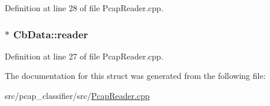 Definition at line 28 of file Pcap\-Reader.\-cpp.

\hypertarget{struct_cb_data_a5215d002d95223186527902c79ef42c3}{
\subsubsection[{reader}]{ $\ast$ Cb\-Data\-::reader}}\label{struct_cb_data_a5215d002d95223186527902c79ef42c3}


Definition at line 27 of file Pcap\-Reader.\-cpp.



The documentation for this struct was generated from the following file\-:\begin{DoxyCompactItemize}
\item 
src/pcap\-\_\-classifier/src/\hyperlink{pcap__classifier_2src_2_pcap_reader_8cpp}{Pcap\-Reader.\-cpp}\end{DoxyCompactItemize}
